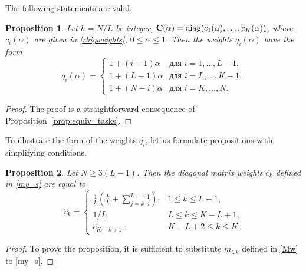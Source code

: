 \documentclass[sii]{ipart}
\newtheorem{proposition}{Proposition}
\begin{document}
The following statements are valid.

\begin{proposition}\label{prop:zhigconseq}
	Let $h = N/L$ be integer, $\mathbf{C}(\alpha) = \mathop{\mathrm{diag}}(c_1(\alpha), \ldots, c_K(\alpha))$, where $c_i(\alpha)$ are given in \eqref{zhigweights}, $0 \le \alpha \le 1$. Then the weights $q_i(\alpha)$ have the form
	\begin{equation*}
	q_i (\alpha) = \begin{cases}
	1 + (i - 1) \alpha & \text{для $i = 1, \ldots, L-1,$}\\
	1 + (L - 1) \alpha & \text{для $i = L, \ldots, K-1,$}\\
	1 + (N - i) \alpha & \text{для $i = K, \ldots, N.$}
	\end{cases}
	\end{equation*}
\end{proposition}
\begin{proof}
	The proof is a straightforward consequence of Proposition~\ref{prop:equiv_tasks}.
\end{proof}

To illustrate the form of the weights $\hat{q_i}$, let us formulate propositions with simplifying conditions.
\begin{proposition} \label{myweightstat}
	Let $N \ge 3(L-1)$. Then the diagonal matrix weights $\hat c_k$ defined in \eqref{my_s} are equal to
	\begin{equation*}
	\hat c_k = \begin{cases}
	\frac{1}{L}\left(\frac{k}{L} + \sum_{j=k}^{L-1} \frac{1}{j} \right),& 1 \le k \le L-1, \\
	1/L, & L \le k \le K - L + 1,\\
	\hat c_{K - k + 1}, & K - L + 2 \le k \le K.
 	          \end{cases}
	\end{equation*}
\end{proposition}

\begin{proof}
	To prove the proposition, it is sufficient to substitute $m_{l,k}$ defined in \eqref{Mw} to \eqref{my_s}.
\end{proof}
\end{document}
